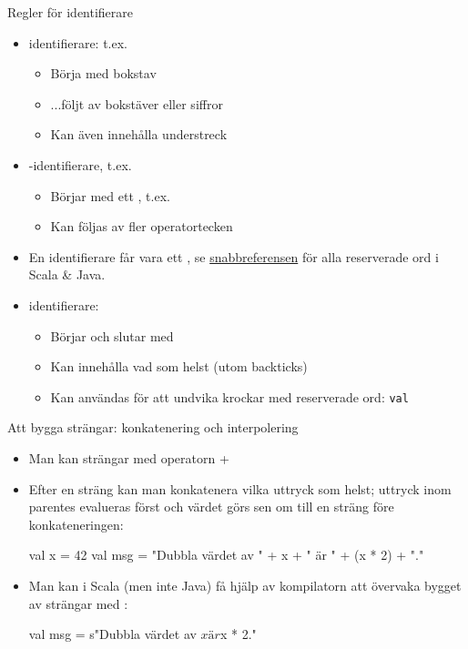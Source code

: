 \documentclass{simpleslides}
\begin{document}
  
  \begin{Slide}{Regler för identifierare}
  \begin{itemize}
  \item {} identifierare: t.ex. 
  \begin{itemize}
  \item Börja med bokstav
  \item ...följt av bokstäver eller siffror
  \item Kan även innehålla understreck
  \end{itemize}
  
  \item {}-identifierare, t.ex. \code{+:}
  \begin{itemize}
  \item Börjar med ett , t.ex. 
  \item Kan följas av fler operatortecken
  \end{itemize}
  
  
  \item En identifierare får  vara ett , se \href{http://cs.lth.se/pgk/quickref}{snabbreferensen} för alla reserverade ord i Scala \& Java.
  
  \item {} identifierare: 
  \begin{itemize}
  \item Börjar och slutar med   
  \item Kan innehålla vad som helst (utom backticks)
  \item Kan användas för att undvika krockar med reserverade ord: \texttt{val}
  \end{itemize}
  
  \end{itemize}
  \end{Slide}


  \begin{Slide}{Att bygga strängar: konkatenering och interpolering}
    \begin{itemize}
    \item Man kan  strängar med operatorn + \\ 
    \item Efter en sträng kan man konkatenera vilka uttryck som helst; uttryck inom parentes evalueras först och värdet görs sen om till en sträng före konkateneringen:
    \begin{Code}
    val x = 42
    val msg = "Dubbla värdet av " + x + " är " + (x * 2) + "."
    \end{Code}
    \item Man kan i Scala (men inte Java) få hjälp av kompilatorn att övervaka bygget av strängar med  :
    \begin{Code}
    val msg = s"Dubbla värdet av $x är ${x * 2}."
    \end{Code}
    
    \end{itemize}
    \end{Slide}
    
\end{document}
